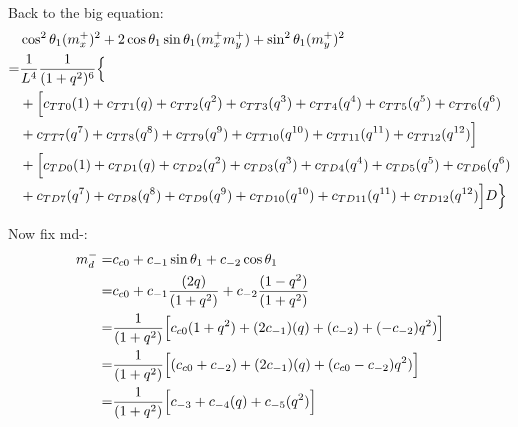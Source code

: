 \documentclass[12pt]{article}
\begin{document}
Back to the big equation:
\begin{align}
    &\cos^2\theta_1(m_x^+)^2  + 2\cos\theta_1\sin\theta_1(m_x^+m_y^+)  +\sin^2\theta_1(m_y^+)^2 \\
    =& \frac{1}{L^4} \frac{1}{(1+q^2)^6} \Bigl\{ \nonumber\\
    &+ \Bigl[ c_{TT0}(1) + c_{TT1}(q) + c_{TT2}(q^2) + c_{TT3}(q^3) + c_{TT4}(q^4) + c_{TT5}(q^5) + c_{TT6}(q^6) \nonumber\\
    &+ c_{TT7}(q^7) + c_{TT8}(q^8) + c_{TT9}(q^9) + c_{TT10}(q^{10}) + c_{TT11}(q^{11}) + c_{TT12}(q^{12}) \Bigr] \nonumber\\
    &+ \Bigl[ c_{TD0}(1) + c_{TD1}(q) + c_{TD2}(q^2) + c_{TD3}(q^3) + c_{TD4}(q^4) + c_{TD5}(q^5) + c_{TD6}(q^6) \nonumber\\
    &+ c_{TD7}(q^7) + c_{TD8}(q^8) + c_{TD9}(q^9) + c_{TD10}(q^{10}) + c_{TD11}(q^{11}) + c_{TD12}(q^{12}) \Bigr]D  \Bigr\}
\end{align}

Now fix md-:
\begin{align}
    m_d^- =& c_{c0} +c_{-1}\sin\theta_1 + c_{-2}\cos\theta_1\\
    =& c_{c0} +c_{-1}\frac{(2q)}{(1+q^2)} + c_{-2}\frac{(1-q^2)}{(1+q^2)}\\
    =& \frac{1}{(1+q^2)} \Bigl[ c_{c0}(1+q^2) + (2c_{-1})(q) + (c_{-2}) + (-c_{-2})q^2) \Bigr]\\
    =& \frac{1}{(1+q^2)} \Bigl[ (c_{c0} +c_{-2}) + (2c_{-1})(q) + (c_{c0} -c_{-2})q^2) \Bigr] \\
    =& \frac{1}{(1+q^2)} \Bigl[ c_{-3} + c_{-4}(q) + c_{-5}(q^2) \Bigr]
\end{align}
\end{document}
